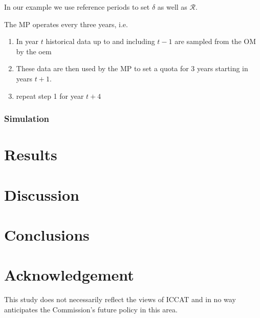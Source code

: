 \documentclass[%
nonumbib,      %
%
]{nrc1}                          %
\begin{document}
In our example we use reference periods to set $\delta$ as well as $\mathcal{R}$. 

The MP operates every three years, i.e. 

\begin{enumerate}
 \item In year $t$ historical data up to and including $t-1$ are sampled from the OM by the oem
 \item These data are then used by the MP to set a quota for 3 years starting in years $t+1$. 
 \item repeat step 1 for year $t+4$
\end{enumerate}


\subsubsection*{Simulation}


\section*{Results}


\section*{Discussion}


\newpage
\section*{Conclusions}


\section{Acknowledgement}

This study does not necessarily reflect the views of ICCAT and in no way anticipates the Commission's future policy in this area. 

\newpage\clearpage


%

\newpage
\end{document}
